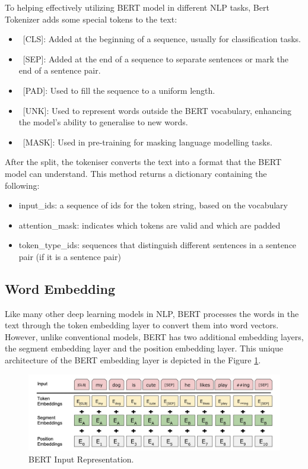 \documentclass[ %
                    author={Louis Wang},
                supervisor={Dr. Qiang Liu},
                    degree={MSc},
                     title={Identification of Suicide Ideation in Texts},
                      type={},
                      year={2024}]{dissertation}
\begin{document}
To helping effectively utilizing BERT model in different NLP tasks, Bert Tokenizer adds some special tokens to the text:

\begin{itemize}
      \item\ [CLS]: Added at the beginning of a sequence, usually for classification tasks.
      \item\ [SEP]: Added at the end of a sequence to separate sentences or mark the end of a sentence pair.
      \item\ [PAD]: Used to fill the sequence to a uniform length.
      \item\ [UNK]: Used to represent words outside the BERT vocabulary, enhancing the model's ability to generalise to new words.
      \item\ [MASK]: Used in pre-training for masking language modelling tasks.
\end{itemize}

After the split, the tokeniser converts the text into a format that the BERT model can understand. This method returns a dictionary containing the following:

\begin{itemize}
      \item input\_ids: a sequence of ids for the token string, based on the vocabulary
      \item attention\_mask: indicates which tokens are valid and which are padded
      \item token\_type\_ids: sequences that distinguish different sentences in a sentence pair (if it is a sentence pair)
\end{itemize}

\subsection{Word Embedding}
\noindent
Like many other deep learning models in NLP, BERT processes the words in the text through the token embedding layer to convert them into word vectors. However, unlike conventional models, BERT has two additional embedding layers, the segment embedding layer and the position embedding layer. This unique architecture of the BERT embedding layer is depicted in the Figure \ref{fig:bert_embedding}.

\begin{figure}[h]
      \centering
      \includegraphics[width=0.6\linewidth]{../img/bert_embedding.jpg}
      \caption[BERT Input Representation]{BERT Input Representation.\cite{devlin2018bert}}
      \label{fig:bert_embedding}
\end{figure}
\end{document}
